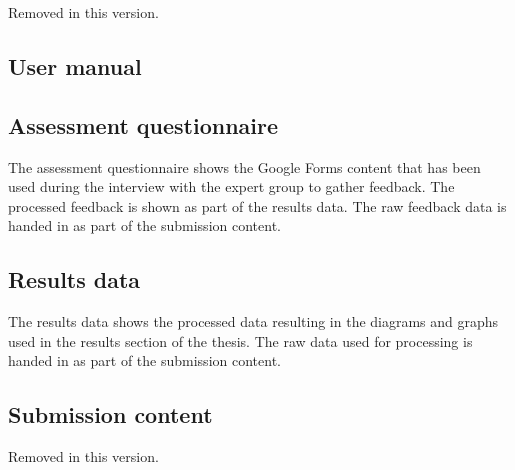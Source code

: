\documentclass[11pt,a4paper]{article}
\begin{document}
    \clearpage
    Removed in this version.

    \clearpage
    \subsection*{User manual}
    

    \clearpage
    \subsection*{Assessment questionnaire}
    The assessment questionnaire shows the Google Forms content that has been used during the interview with the expert group to gather feedback.
    The processed feedback is shown as part of the results data.
    The raw feedback data is handed in as part of the submission content.
    

    \clearpage
    \subsection*{Results data}
    The results data shows the processed data resulting in the diagrams and graphs used in the results section of the thesis.
    The raw data used for processing is handed in as part of the submission content.
    
    

    \clearpage
    

    \clearpage
    \subsection*{Submission content}
    Removed in this version.
\end{document}
